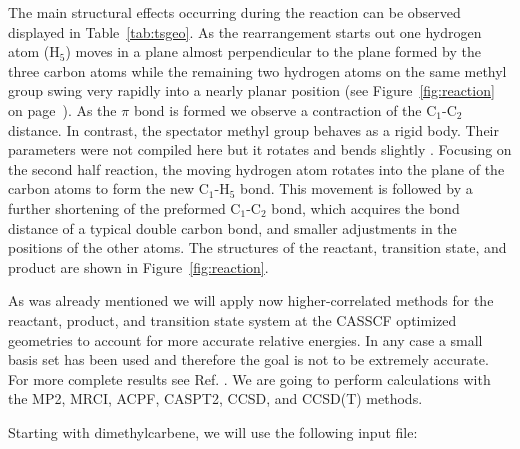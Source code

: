 The main structural effects occurring during the reaction can be observed
displayed in Table~\ref{tab:tsgeo}.  As the rearrangement starts out one
hydrogen atom (H$_5$) moves in a plane almost perpendicular to the plane
formed by the three carbon atoms while the remaining two hydrogen atoms
on the same methyl group swing very rapidly into a nearly planar
position (see Figure~\ref{fig:reaction} on page~\pageref{fig:reaction}).
As the $\pi$ bond is formed we observe
a contraction of the C$_1$-C$_2$ distance. In contrast, the spectator
methyl group behaves as a rigid body. Their parameters were
not compiled here but it rotates and bends slightly \cite{Ford:97}. Focusing 
on the second half reaction, the moving hydrogen atom rotates into the
plane of the carbon atoms to form the new C$_1$-H$_5$ bond. This movement
is followed by a further shortening of the preformed C$_1$-C$_2$ bond,
which acquires the bond distance of a typical double carbon bond, and
smaller adjustments in the positions of the other atoms. The structures
of the reactant, transition state, and product are shown in
Figure~\ref{fig:reaction}.

As was already mentioned we will apply now higher-correlated methods
for the reactant, product, and transition state system at the CASSCF
optimized geometries to account for more accurate relative energies.
In any case a small basis set has been used and therefore the goal is
not to be extremely accurate. For more complete results see Ref.
\cite{Ford:97}. We are going to perform calculations with the
MP2, MRCI, ACPF, CASPT2, CCSD, and CCSD(T) methods.

Starting with dimethylcarbene, we will use the following input file:


